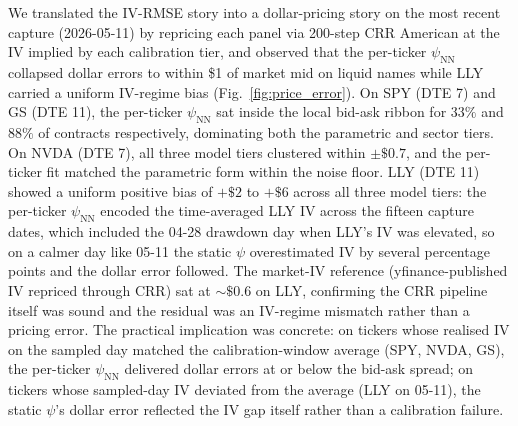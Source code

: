 We translated the IV-RMSE story into a dollar-pricing story on the most recent capture (2026-05-11) by repricing each panel via 200-step CRR American at the IV implied by each calibration tier, and observed that the per-ticker $\psi_{\mathrm{NN}}$ collapsed dollar errors to within \$1 of market mid on liquid names while LLY carried a uniform IV-regime bias (Fig.~\ref{fig:price_error}). On SPY (DTE 7) and GS (DTE 11), the per-ticker $\psi_{\mathrm{NN}}$ sat inside the local bid-ask ribbon for $33\%$ and $88\%$ of contracts respectively, dominating both the parametric and sector tiers. On NVDA (DTE 7), all three model tiers clustered within $\pm\$0.7$, and the per-ticker fit matched the parametric form within the noise floor. LLY (DTE 11) showed a uniform positive bias of $+\$2$ to $+\$6$ across all three model tiers: the per-ticker $\psi_{\mathrm{NN}}$ encoded the time-averaged LLY IV across the fifteen capture dates, which included the 04-28 drawdown day when LLY's IV was elevated, so on a calmer day like 05-11 the static $\psi$ overestimated IV by several percentage points and the dollar error followed. The market-IV reference (yfinance-published IV repriced through CRR) sat at $\sim\$0.6$ on LLY, confirming the CRR pipeline itself was sound and the residual was an IV-regime mismatch rather than a pricing error. The practical implication was concrete: on tickers whose realised IV on the sampled day matched the calibration-window average (SPY, NVDA, GS), the per-ticker $\psi_{\mathrm{NN}}$ delivered dollar errors at or below the bid-ask spread; on tickers whose sampled-day IV deviated from the average (LLY on 05-11), the static $\psi$'s dollar error reflected the IV gap itself rather than a calibration failure.

